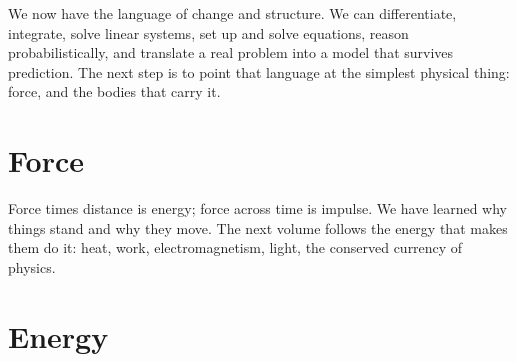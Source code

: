 \documentclass[11pt,a4paper,openright,twoside]{memoir}
\begin{document}
\begin{interlude}
We now have the language of change and structure.
We can differentiate, integrate, solve linear systems, set up and solve equations, reason probabilistically, and translate a real problem into a model that survives prediction.
The next step is to point that language at the simplest physical thing: force, and the bodies that carry it.
\end{interlude}

\part{Force}
\label{vol03}

















\begin{interlude}
Force times distance is energy; force across time is impulse.
We have learned why things stand and why they move.
The next volume follows the energy that makes them do it: heat, work, electromagnetism, light, the conserved currency of physics.
\end{interlude}

\part{Energy}
\label{vol04}

















\end{document}

